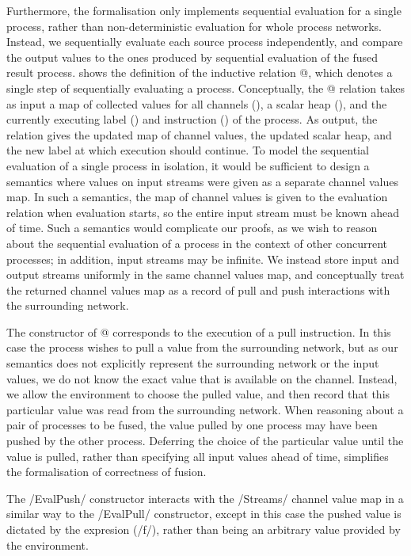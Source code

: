 Furthermore, the formalisation only implements sequential evaluation for a single process, rather than non-deterministic evaluation for whole process networks.
Instead, we sequentially evaluate each source process independently, and compare the output values to the ones produced by sequential evaluation of the fused result process.
 shows the definition of the inductive relation @, which denotes a single step of sequentially evaluating a process.
Conceptually, the @ relation takes as input a map of collected values for all channels (\Hs@Streams@), a scalar heap (\Hs@Heap@), and the currently executing label (\Hs@Label@) and instruction (\Hs@Instruction@) of the process.
As output, the relation gives the updated map of channel values, the updated scalar heap, and the new label at which execution should continue.
To model the sequential evaluation of a single process in isolation, it would be sufficient to design a semantics where values on input streams were given as a separate channel values map.
In such a semantics, the map of channel values is given to the evaluation relation when evaluation starts, so the entire input stream must be known ahead of time.
Such a semantics would complicate our proofs, as we wish to reason about the sequential evaluation of a process in the context of other concurrent processes; in addition, input streams may be infinite.
We instead store input and output streams uniformly in the same channel values map, and conceptually treat the returned channel values map as a record of pull and push interactions with the surrounding network.

The \Hs@EvalPull@ constructor of @ corresponds to the execution of a pull instruction. 
In this case the process wishes to pull a value from the surrounding network, but as our semantics does not explicitly represent the surrounding network or the input values, we do not know the exact value that is available on the channel.
Instead, we allow the environment to choose the pulled value, and then record that this particular value was read from the surrounding network.
When reasoning about a pair of processes to be fused, the value pulled by one process may have been pushed by the other process.
Deferring the choice of the particular value until the value is pulled, rather than specifying all input values ahead of time, simplifies the formalisation of correctness of fusion.

The \Hs/EvalPush/ constructor interacts with the \Hs/Streams/ channel value map in a similar way to the \Hs/EvalPull/ constructor, except in this case the pushed value is dictated by the expresion (\Hs/f/), rather than being an arbitrary value provided by the environment.

